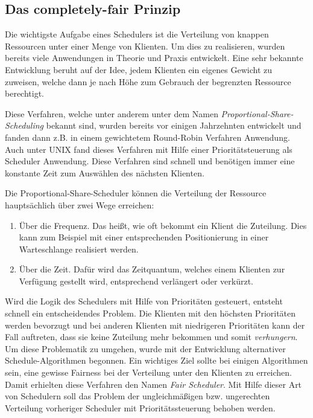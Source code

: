 \subsection{Das completely-fair Prinzip}\label{s:fair}
Die wichtigste Aufgabe eines Schedulers ist die Verteilung von knappen Ressourcen unter einer Menge von Klienten. 
Um dies zu realisieren, wurden bereits viele Anwendungen in Theorie und Praxis entwickelt.
Eine sehr bekannte Entwicklung beruht auf der Idee, jedem Klienten ein eigenes Gewicht zu zuweisen, welche dann je nach Höhe zum Gebrauch der begrenzten Ressource berechtigt.

Diese Verfahren, welche unter anderem unter dem Namen \textit{Proportional-Share-Scheduling} bekannt sind, wurden bereits vor einigen Jahrzehnten entwickelt und fanden dann z.B. in einem gewichtetem Round-Robin Verfahren Anwendung. Auch unter UNIX fand dieses Verfahren  mit Hilfe einer Prioritätsteuer\-ung als Scheduler Anwendung. Diese Verfahren sind schnell und benötigen immer eine konstante Zeit zum Auswählen des nächsten Klienten. 

Die Proportional-Share-Scheduler können die Verteilung der Ressource hauptsächlich über zwei Wege erreichen:
\begin{enumerate}
	\item Über die Frequenz. Das heißt, wie oft bekommt ein Klient die Zuteilung. Dies kann zum Beispiel mit einer entsprechenden Positionierung in einer Warteschlange realisiert werden.
	\item Über die Zeit. Dafür wird das Zeitquantum, welches einem Klienten zur Verfügung gestellt wird, entsprechend verlängert oder verkürzt.
\end{enumerate}

Wird die Logik des Schedulers mit Hilfe von Prioritäten gesteuert, entsteht schnell ein entscheidendes Problem. Die Klienten mit den höchsten Prioritäten werden bevorzugt und bei anderen Klienten mit niedrigeren Prioritäten kann der Fall auftreten, dass sie keine Zuteilung mehr bekommen und somit \textit{verhungern}.
Um diese Problematik zu umgehen, wurde mit der Entwicklung alternativer Schedule-Algorithmen begonnen. Ein wichtiges Ziel sollte bei einigen Algorithmen sein, eine gewisse Fairness bei der Verteilung unter den Klienten zu erreichen. Damit erhielten diese Verfahren den Namen \textit{Fair Scheduler}. Mit Hilfe dieser Art von Schedulern soll das Problem der ungleich\-mäßigen bzw. ungerechten Verteilung vorheriger Scheduler mit Prioritäts\-steuer\-ung  behoben werden.

